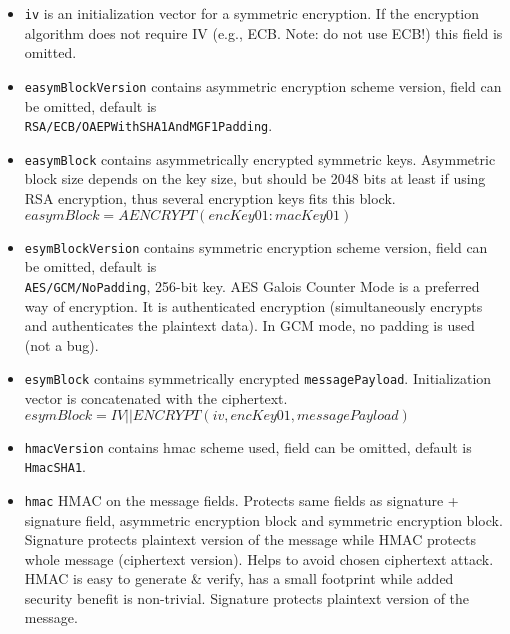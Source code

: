 \documentclass[a4paper,10pt]{article}
\begin{document}
\begin{itemize}
$
sig = SIGN_{privKey}(hash(protocolType:protocolVersion:ampType:ampVersion:sequenceNumber:randomNonce:sender:
destination:destinationType:iv:encKey01:macKey01:messagePayload)) 
$

\item \verb#iv# is an initialization vector for a symmetric encryption. If the encryption algorithm does not require IV (e.g., ECB. Note: do not use ECB!)
this field is omitted.

\item \verb#easymBlockVersion# contains asymmetric encryption scheme version, field can be omitted, default is \\\verb#RSA/ECB/OAEPWithSHA1AndMGF1Padding#.
\item \verb#easymBlock# contains asymmetrically encrypted symmetric keys. Asymmetric block size depends on the key size, but should be 2048 bits
at least if using RSA encryption, thus several encryption keys fits this block.\\
$easymBlock = AENCRYPT(encKey01:macKey01)$

\item \verb#esymBlockVersion# contains symmetric encryption scheme version, field can be omitted, default is \\\verb#AES/GCM/NoPadding#, 256-bit key.
AES Galois Counter Mode is a preferred way of encryption. 
It is authenticated encryption (simultaneously encrypts and authenticates the plaintext data). In GCM mode, no padding is used (not a bug).

\item \verb#esymBlock# contains symmetrically encrypted \verb#messagePayload#. Initialization vector is concatenated with the ciphertext.\\
$esymBlock = IV || ENCRYPT(iv, encKey01, messagePayload)$

\item \verb#hmacVersion# contains hmac scheme used, field can be omitted, default is \verb#HmacSHA1#.

\item \verb#hmac# HMAC on the message fields. Protects same fields as signature + signature field, 
asymmetric encryption block and symmetric encryption block. Signature protects plaintext version of the message 
while HMAC protects whole message (ciphertext version). Helps to avoid chosen ciphertext attack. 
HMAC is easy to generate \& verify, has a small footprint while added security benefit is non-trivial.
Signature protects plaintext version of the message.


\end{itemize}
\end{document}
